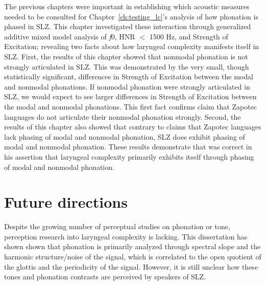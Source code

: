 The previous chapters were important in establishing which acoustic measures needed to be consulted for Chapter~\ref{ch:testing_lc}'s analysis of how phonation is phased in SLZ. This chapter investigated these interaction through generalized additive mixed model analysis of \textit{f}0, HNR $<$ 1500 Hz, and Strength of Excitation; revealing two facts about how laryngeal complexity manifests itself in SLZ. First, the results of this chapter showed that nonmodal phonation is not strongly articulated in SLZ. This was demonstrated by the very small, though statistically significant, differences in Strength of Excitation between the modal and nonmodal phonations. If nonmodal phonation were strongly articulated in SLZ, we would expect to see larger differences in Strength of Excitation between the modal and nonmodal phonations. This first fact confirms  claim that Zapotec languages do not articulate their nonmodal phonation strongly. Second, the results of this chapter also showed that contrary to  claims that Zapotec languages lack phasing of modal and nonmodal phonation, SLZ does exhibit phasing of modal and nonmodal phonation. These results demonstrate that \citet{silvermanLaryngealComplexityOtomanguean1997,silvermanPhasingRecoverability1997} was correct in his assertion that laryngeal complexity primarily exhibits itself through phasing of modal and nonmodal phonation.

\section{Future directions}\label{sec:future_directions}


Despite the growing number of perceptual studies on phonation or tone, perception research into laryngeal complexity is lacking. This dissertation has shown shown that phonation is primarily analyzed through spectral slope and the harmonic structure/noise of the signal, which is correlated to the open quotient of the glottis and the periodicity of the signal. However, it is still unclear how these tones and phonation contrasts are perceived by speakers of SLZ. 

